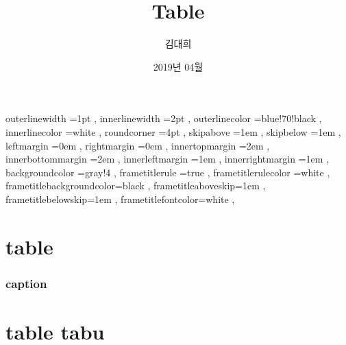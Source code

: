\documentclass[12pt, a4paper, oneside]{book}
\let\stdsection\section
\renewcommand\section{\newpage\stdsection}
\begin{document}
	
			\dominitoc
			\doparttoc			




			\title{Table}
			\author{김대희}
			\date{2019년 04월}
			\maketitle


			\tableofcontents 		%

			\cleardoublepage
			\listoffigures 			%

			\cleardoublepage
			\listoftables 			%





		 {
						outerlinewidth		=1pt			,%
						innerlinewidth		=2pt			,%
						outerlinecolor		=blue!70!black	,%
						innerlinecolor		=white 			,%
						roundcorner			=4pt			,%
						skipabove			=1em 			,%
						skipbelow			=1em 			,%
						leftmargin			=0em			,%
						rightmargin			=0em			,%
						innertopmargin		=2em 			,%
						innerbottommargin 	=2em 			,%
						innerleftmargin		=1em 			,%
						innerrightmargin		=1em 			,%
						backgroundcolor		=gray!4			,%
						frametitlerule		=true 			,%
						frametitlerulecolor	=white			,%
						frametitlebackgroundcolor=black		,%
						frametitleaboveskip=1em 			,%
						frametitlebelowskip=1em 			,%
						frametitlefontcolor=white 			,%
						}



	\part{table}
	\noptcrule
	\parttoc				



		\section{	caption	}				





	\part{table tabu}
	\noptcrule
	\parttoc				
\end{document}
